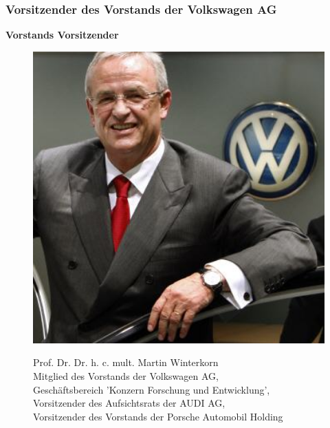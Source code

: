 \documentclass[12pt]{article}
\begin{document}
\subsubsection{Vorsitzender des Vorstands der Volkswagen AG}
\textbf{Vorstands Vorsitzender}
\begin{figure}[here!]
	\centering
	\begin{minipage}[h]{0.20\textwidth}
		\centering
		\includegraphics[width=1.0\textwidth]{images/MartinWinterkorn.jpg}
		\label{fig:vorstandvw0}
	\end{minipage}
		\begin{minipage}[h]{0.10\textwidth}
		\hspace{1cm} 
	\end{minipage}
	\begin{minipage}[h]{0.65\textwidth}
		Prof. Dr. Dr. h. c. mult. Martin Winterkorn\\
		Mitglied des Vorstands der Volkswagen AG,\\
		Geschäftsbereich 'Konzern Forschung und Entwicklung',\\
		Vorsitzender des Aufsichtsrats der AUDI AG,\\
		Vorsitzender des Vorstands der Porsche Automobil Holding 
	\end{minipage}
\end{figure}\FloatBarrier\noindent
\end{document}
